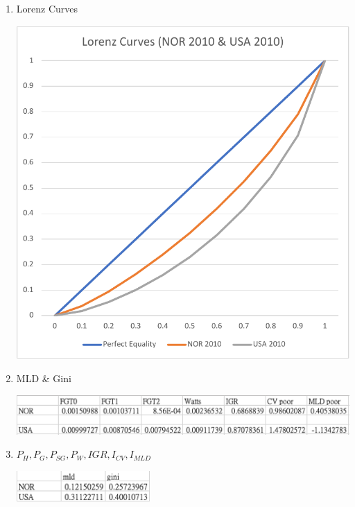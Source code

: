 \documentclass{article}[13pt]
\begin{document}
\begin{enumerate}
    \item{Lorenz Curves}
    
    \includegraphics[width=5in]{nor_usa_lorenz.pdf}

    \item{MLD \& Gini}
    
    \includegraphics[width=5in]{nor_usa_1.png}

    \item{$P_H, P_G, P_{SG}, P_W, IGR, I_{CV}, I_{MLD}$}
    
    \includegraphics[width=2in]{nor_usa_2.png}
\end{enumerate}
\end{document}
